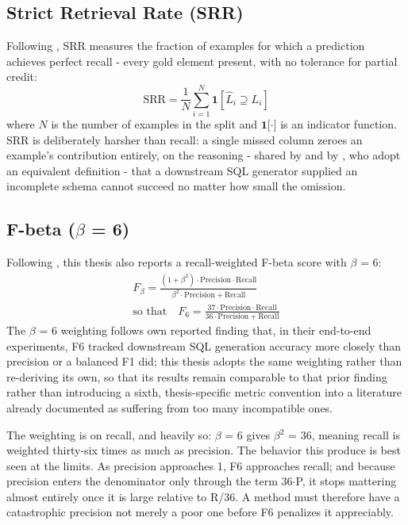 \subsection{Strict Retrieval Rate (SRR)}\label{sec:4-5-2}

Following \citet{cao2024}, SRR measures the fraction of examples for which a prediction achieves perfect recall - every gold element present, with no tolerance for partial credit: 
\begin{equation*}
  \mathrm{SRR} = \frac{1}{N} \sum_{i=1}^{N} \mathbf{1}\!\left[\hat{L}_i \supseteq L_i\right]
\end{equation*}
where \ensuremath{N} is the number of examples in the split and \ensuremath{\mathbf{1}}{[}\ensuremath{\cdot}{]} is an indicator function. SRR is deliberately harsher than recall: a single missed column zeroes an example's contribution entirely, on the reasoning - shared by \citet{cao2024} and by \citet{katsogiannismeimarakis2026}, who adopt an equivalent definition - that a downstream SQL generator supplied an incomplete schema cannot succeed no matter how small the omission.

\subsection{F-beta (\texorpdfstring{\ensuremath{\beta}}{beta} = 6)}\label{sec:4-5-3}

Following \citet{glass2025}, this thesis also reports a recall-weighted F-beta score with \ensuremath{\beta} = 6: 
\begin{gather*}
  F_\beta = \frac{(1 + \beta^{2}) \cdot \mathrm{Precision} \cdot \mathrm{Recall}}{\beta^{2} \cdot \mathrm{Precision} + \mathrm{Recall}}
  \\[0.8ex]
  \text{so that}\quad
  F_6 = \frac{37 \cdot \mathrm{Precision} \cdot \mathrm{Recall}}{36 \cdot \mathrm{Precision} + \mathrm{Recall}}
\end{gather*}
 The \ensuremath{\beta} = 6 weighting follows \citet{glass2025} own reported finding that, in their end-to-end experiments, F6 tracked downstream SQL generation accuracy more closely than precision or a balanced F1 did; this thesis adopts the same weighting rather than re-deriving its own, so that its results remain comparable to that prior finding rather than introducing a sixth, thesis-specific metric convention into a literature already documented as suffering from too many incompatible ones.

The weighting is on recall, and heavily so: \ensuremath{\beta} = 6 gives \ensuremath{\beta}\ensuremath{^{2}} = 36, meaning recall is weighted thirty-six times as much as precision. The behavior this produce is best seen at the limits. As precision approaches 1, F6 approaches recall; and because precision enters the denominator only through the term 36\ensuremath{\cdot}P, it stops mattering almost entirely once it is large relative to R/36. A method must therefore have a catastrophic precision not merely a poor one before F6 penalizes it appreciably.

